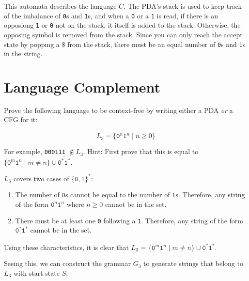 \documentclass{article}
\begin{document}
        This automata describes the language $C$. The PDA's stack is used to keep track of the imbalance of \texttt{0}s and \texttt{1}s, and when a \texttt{0} or a \texttt{1} is read, if there is an opposiong \texttt{1} or \texttt{0} not on the stack, it itself is added to the stack. Otherwise, the opposing symbol is removed from the stack. Since you can only reach the accept state by popping a $\$$ from the stack, there must be an equal number of \texttt{0}s and \texttt{1}s in the string.

    \section{Language Complement}

        Prove the following language to be context-free by writing either a PDA \textit{or} a CFG for it:

        \begin{equation*}
            L_3 = \overline{\{\texttt{0}^n \texttt{1}^n \mid n \ge 0\}}
        \end{equation*}

        For example, \texttt{000111} $\notin L_3$. Hint: First prove that this is equal to $\{\texttt{0}^m \texttt{1}^n \mid m \neq n\} \cup \overline{\texttt{0}^* \texttt{1}^*}$. 

        $L_3$ covers two cases of $\{\texttt{0}, \texttt{1}\}^*$: 

        \begin{enumerate}[1.]
            \item The number of $\texttt{0}$s cannot be equal to the number of $\texttt{1}$s. Therefore, any string of the form $\texttt{0}^n \texttt{1}^n$ where $n \ge 0$ cannot be in the set.

            \item There must be at least one \texttt{0} following a \texttt{1}. Therefore, any string of the form $\texttt{0}^* \texttt{1}^*$ cannot be in the set.
        \end{enumerate}

        Using these characteristics, it is clear that $L_3$ = $\{\texttt{0}^m \texttt{1}^n \mid m \neq n\} \cup \overline{\texttt{0}^* \texttt{1}^*}$. 

        Seeing this, we can construct the grammar $G_3$ to generate strings that belong to $L_3$ with start state $S$:
\end{document}
